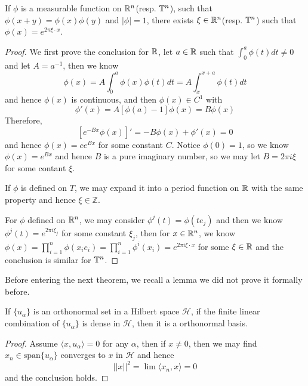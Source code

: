 \begin{theorem}
    If $\phi$ is a measurable function on $\mathbb{R}^n$(resp. $\mathbb{T}^n$), such that $\phi(x+y) = \phi(x)\phi(y)$ and $|\phi|=1$, there exists $\xi\in\mathbb{R}^n$(resp. $\mathbb{T}^n$) such that $\phi(x) = e^{2\pi\xi\cdot x}$.
\end{theorem}
\begin{proof}\par
    We first prove the conclusion for $\mathbb{R}$, let $a\in \mathbb{R}$ such that $\int_0^a \phi(t)dt\neq 0$ and let $A = a^{-1}$, then we know
    \[
    \phi(x) = A\int_0^a \phi(x)\phi(t)dt = A\int_x^{x+a}\phi(t)dt
    \]
    and hence $\phi(x)$ is continuous, and then $\phi(x)\in C^1$ with
    \[
    \phi'(x) = A[\phi(a)-1]\phi(x) = B\phi(x)
    \]
    Therefore,
    \[
    [e^{-Bx}\phi(x)]' = -B\phi(x)+\phi'(x) = 0 
    \]
    and hence $\phi(x) = ce^{Bx}$ for some constant $C$. Notice $\phi(0)= 1$, so we know $\phi(x) =e^{Bx}$ and hence $B$ is a pure imaginary number, so we may let $B = 2\pi i \xi$ for some contant $\xi$.\par
    If $\phi$ is defined on $T$, we may expand it into a period function on $\mathbb{R}$ with the same property and hence $\xi\in \mathbb{Z}$.\par
    For $\phi$ defined on $\mathbb{R}^n$, we may consider $\phi^j(t) = \phi(te_j)$ and then we know $\phi^j(t) = e^{2\pi i \xi_j}$ for some constant $\xi_j$, then for $x\in\mathbb{R}^n$, we know $\phi(x) = \prod_{i=1}^n \phi(x_i e_i) = \prod_{i=1}^n \phi^i(x_i)= e^{2\pi i \xi\cdot x}$ for some $\xi \in \mathbb{R}$ and the conclusion is similar for $\mathbb{T}^n$. 
\end{proof}

Before entering the next theorem, we recall a lemma we did not prove it formally before.

\begin{lemma}
    If $\{u_{\alpha}\}$ is an orthonormal set in a Hilbert space $\mathcal{H}$, if the finite linear combination of $\{u_{\alpha}\}$ is dense in $\mathcal{H}$, then it is a orthonormal basis.
\end{lemma}
\begin{proof}
    Assume $\langle x,u_{\alpha}\rangle = 0$ for any $\alpha$, then if $x\neq 0$, then we may find $x_n \in \text{span}\{u_{\alpha}\}$ converges to $x$ in $\mathcal{H}$ and hence
    \[
    ||x||^2 = \lim\langle x_n,x\rangle =0
    \] 
    and the conclusion holds.
\end{proof}

